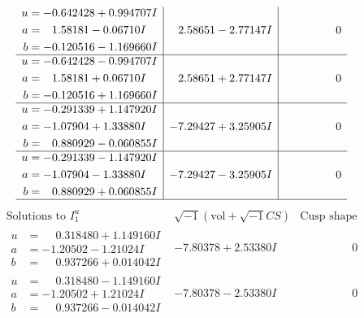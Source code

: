\documentclass[1p]{elsarticle_modified}
\theoremstyle{definition}
\newcommand{\I}{\sqrt{-1}}
\begin{document}
$$\begin{array}{c|c|c}
\begin{aligned}
u &= -0.642428 + 0.994707 I \\
a &= \phantom{-}1.58181 - 0.06710 I \\
b &= -0.120516 - 1.169660 I\end{aligned}
 & \phantom{-}2.58651 - 2.77147 I & \phantom{-0.000000 } 0 \\ \hline\begin{aligned}
u &= -0.642428 - 0.994707 I \\
a &= \phantom{-}1.58181 + 0.06710 I \\
b &= -0.120516 + 1.169660 I\end{aligned}
 & \phantom{-}2.58651 + 2.77147 I & \phantom{-0.000000 } 0 \\ \hline\begin{aligned}
u &= -0.291339 + 1.147920 I \\
a &= -1.07904 + 1.33880 I \\
b &= \phantom{-}0.880929 - 0.060855 I\end{aligned}
 & -7.29427 + 3.25905 I & \phantom{-0.000000 } 0 \\ \hline\begin{aligned}
u &= -0.291339 - 1.147920 I \\
a &= -1.07904 - 1.33880 I \\
b &= \phantom{-}0.880929 + 0.060855 I\end{aligned}
 & -7.29427 - 3.25905 I & \phantom{-0.000000 } 0\\
 \hline 
 \end{array}$$\newpage$$\begin{array}{c|c|c}  
\text{Solutions to }I^u_{1}& \I (\text{vol} + \sqrt{-1}CS) & \text{Cusp shape}\\
 \hline 
\begin{aligned}
u &= \phantom{-}0.318480 + 1.149160 I \\
a &= -1.20502 - 1.21024 I \\
b &= \phantom{-}0.937266 + 0.014042 I\end{aligned}
 & -7.80378 + 2.53380 I & \phantom{-0.000000 } 0 \\ \hline\begin{aligned}
u &= \phantom{-}0.318480 - 1.149160 I \\
a &= -1.20502 + 1.21024 I \\
b &= \phantom{-}0.937266 - 0.014042 I\end{aligned}
 & -7.80378 - 2.53380 I & \phantom{-0.000000 } 0 \\ \hline\begin{aligned}

\end{aligned}
\end{array}$$
\end{document}
